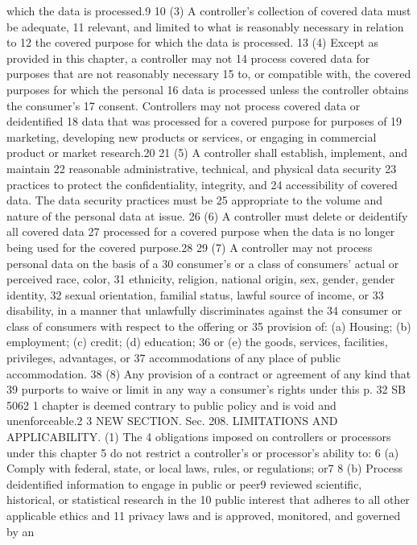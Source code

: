 which the data is processed.9
10 (3) A controller's collection of covered data must be adequate,
11 relevant, and limited to what is reasonably necessary in relation to
12 the covered purpose for which the data is processed.
13 (4) Except as provided in this chapter, a controller may not
14 process covered data for purposes that are not reasonably necessary
15 to, or compatible with, the covered purposes for which the personal
16 data is processed unless the controller obtains the consumer's
17 consent. Controllers may not process covered data or deidentified
18 data that was processed for a covered purpose for purposes of
19 marketing, developing new products or services, or engaging in
commercial product or market research.20
21 (5) A controller shall establish, implement, and maintain
22 reasonable administrative, technical, and physical data security
23 practices to protect the confidentiality, integrity, and
24 accessibility of covered data. The data security practices must be
25 appropriate to the volume and nature of the personal data at issue.
26 (6) A controller must delete or deidentify all covered data
27 processed for a covered purpose when the data is no longer being used
for the covered purpose.28
29 (7) A controller may not process personal data on the basis of a
30 consumer's or a class of consumers' actual or perceived race, color,
31 ethnicity, religion, national origin, sex, gender, gender identity,
32 sexual orientation, familial status, lawful source of income, or
33 disability, in a manner that unlawfully discriminates against the
34 consumer or class of consumers with respect to the offering or
35 provision of: (a) Housing; (b) employment; (c) credit; (d) education;
36 or (e) the goods, services, facilities, privileges, advantages, or
37 accommodations of any place of public accommodation.
38 (8) Any provision of a contract or agreement of any kind that
39 purports to waive or limit in any way a consumer's rights under this
p. 32 SB 5062
1 chapter is deemed contrary to public policy and is void and
unenforceable.2
3 NEW SECTION. Sec. 208. LIMITATIONS AND APPLICABILITY. (1) The
4 obligations imposed on controllers or processors under this chapter
5 do not restrict a controller's or processor's ability to:
6 (a) Comply with federal, state, or local laws, rules, or
regulations; or7
8 (b) Process deidentified information to engage in public or peer9 reviewed scientific, historical, or statistical research in the
10 public interest that adheres to all other applicable ethics and
11 privacy laws and is approved, monitored, and governed by an
